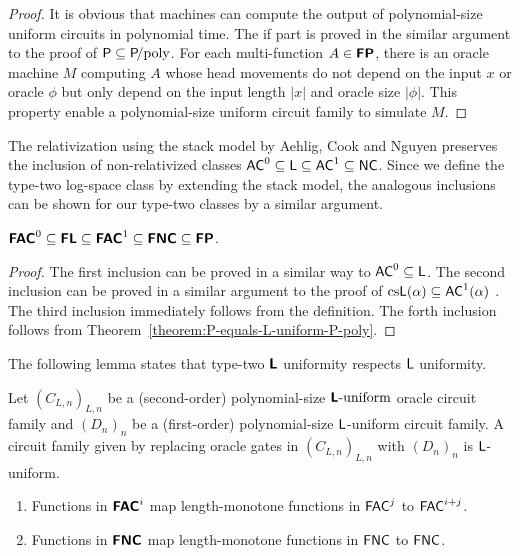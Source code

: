 \documentclass[envcountsame,orivec,oribibl]{llncs}
\begin{document}
\begin{proof}
 It is obvious that machines can compute the output of
 polynomial-size uniform circuits in polynomial time.
 The if part is proved in the similar argument to the proof of
 $\mathsf{P} \subseteq \mathsf{P}\!\text{/poly}$.
 For each multi-function $A \in \text{\bfseries \sffamily \upshape FP}$, there is an oracle machine $M$
 computing $A$ whose head movements do not depend on the input $x$ or oracle
 $\phi$ but only depend on the input length $|x|$ and oracle size $|\phi|$.
 This property enable a polynomial-size uniform circuit family to simulate $M$.
\end{proof}

The relativization using the stack model by Aehlig, Cook and Nguyen preserves
the inclusion of non-relativized classes
$\mathsf{AC}^0 \subseteq \mathsf{L} \subseteq \mathsf{AC}^1 \subseteq \mathsf{NC}$.
Since we define the type-two log-space class by extending the stack model,
the analogous inclusions can be shown for our type-two classes
by a similar argument. 

\begin{theorem}
\label{theorem:inclusion}
$ \text{\bfseries \sffamily \upshape FAC}^0
 \subseteq \text{\bfseries \sffamily \upshape FL} 
 \subseteq \text{\bfseries \sffamily \upshape FAC}^1
 \subseteq \text{\bfseries \sffamily \upshape FNC}
 \subseteq \text{\bfseries \sffamily \upshape FP}$. 
\end{theorem}

\begin{proof}
 The first inclusion can be proved in a similar way
 to $\mathsf{AC}^0 \subseteq \mathsf{L}$.
 The second inclusion can be proved in a similar argument to 
 the proof of $\text{cs}\mathsf{L}(\alpha) \subseteq \mathsf{AC}^1(\alpha)$
 \cite{aehlig2007relativizing}.
 The third inclusion immediately follows from the definition.
 The forth inclusion follows from Theorem~\ref{theorem:P-equals-L-uniform-P-poly}.
\end{proof}


The following lemma states that type-two $\text{\bfseries \sffamily \upshape L}$ uniformity respects
$\mathsf{L}$ uniformity.

\begin{lemma}
\label{lemma: respects uniformity}
 Let $(C_{L,n})_{L,n}$ be a (second-order) polynomial-size $\text{\bfseries \sffamily \upshape L}\text{-uniform}$ oracle circuit family
 and $(D_n)_n$ be a (first-order) polynomial-size $\mathsf{L}$-uniform circuit family.
 A circuit family given by replacing oracle gates in $(C_{L,n})_{L,n}$ with
 $(D_n)_n$ is $\mathsf{L}$-uniform.
\end{lemma}

\begin{corollary}
\label{corollary: type-one and type-two circuit classes}
\begin{enumerate}
 \item Functions in $\text{\bfseries \sffamily \upshape FAC}^i$ 
       map length-monotone functions in $\mathsf{FAC}^j$ 
       to $\mathsf{FAC}^{i+j}$.
 \item Functions in $\text{\bfseries \sffamily \upshape FNC}$
       map length-monotone functions in $\mathsf{FNC}$ 
       to $\mathsf{FNC}$.
\end{enumerate}
\end{corollary}
\end{document}

